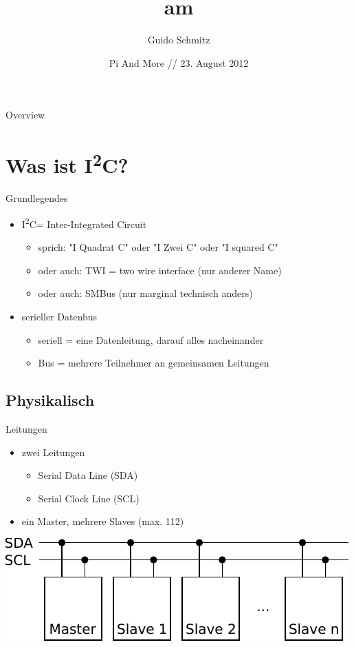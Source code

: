 \documentclass{beamer}
\title{\ItC am \RPi }
\author{Guido Schmitz}
\date{Pi And More // 23. August 2012}
\newcommand{\ItC}{I\textsuperscript{2}C\xspace}
\begin{document}
\lstset{%
   basicstyle=\ttfamily
}


\begin{frame}[plain]
 \titlepage
\end{frame}

\begin{frame}{Overview}
 \tableofcontents
\end{frame}


\section{Was ist \ItC?}

\begin{frame}{Grundlegendes}
 \begin{itemize}
  \item \ItC = Inter-Integrated Circuit
   \begin{itemize}
    \item sprich: "I Quadrat C" oder "I Zwei C" oder "I squared C"
    \item oder auch: TWI = two wire interface (nur anderer Name)
    \item oder auch: SMBus (nur marginal technisch anders)
   \end{itemize}
  \item serieller Datenbus
   \begin{itemize}
    \item seriell = eine Datenleitung, darauf alles nacheinander
    \item Bus = mehrere Teilnehmer an gemeinsamen Leitungen
   \end{itemize}
 \end{itemize}
\end{frame}

\subsection{Physikalisch}

\begin{frame}{Leitungen}
 \begin{itemize}
  \item zwei Leitungen
   \begin{itemize}
    \item Serial Data Line (SDA)
    \item Serial Clock Line (SCL)
   \end{itemize}
  \item ein Master, mehrere Slaves (max. 112)
 \end{itemize}
 \includegraphics[width=\textwidth]{bus}
\end{frame}
\end{document}
